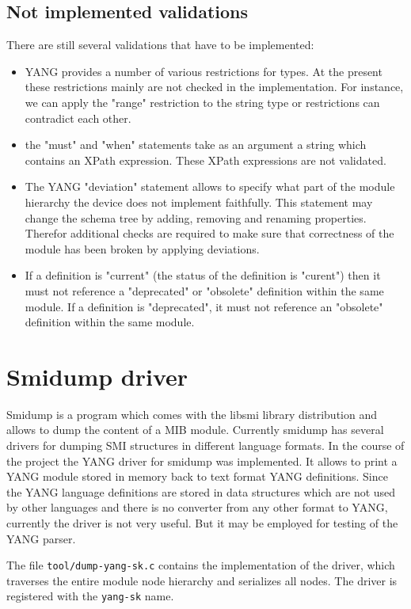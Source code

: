 \documentclass[conference]{IEEEtran}
\begin{document}
\subsection{Not implemented validations}
There are still several validations that have to be implemented:
\begin{itemize}
\item YANG provides a number of various restrictions for types. At the present these restrictions mainly are not checked in the implementation. 
For instance, we can apply the "range" restriction to the string type or restrictions can contradict each other.
\item the "must" and "when" statements take as an argument a string which contains an XPath expression. 
 These XPath expressions are not validated.
\item The YANG "deviation" statement allows to specify what part of the module hierarchy the device does not implement faithfully.
 This statement may change the schema tree by adding, removing and renaming properties. Therefor additional checks are required 
 to make sure that correctness of the module has been broken by applying deviations.
\item If a definition is "current" (the status of the definition is "curent") then it must not reference a "deprecated" or "obsolete" definition within the same module. 
If a definition is "deprecated", it must not reference an "obsolete" definition within the same module.  
\end{itemize}

\section{Smidump driver}
Smidump is a program which comes with the libsmi library distribution and allows to dump the content of a MIB module.
Currently smidump has several drivers for dumping SMI structures in different language formats.
In the course of the project the YANG driver for smidump was implemented. 
It allows to print a YANG module stored in memory back to text format YANG definitions. 
Since the YANG language definitions are stored in data structures which are not used by other languages and there is no converter from any other format to YANG,
currently the driver is not very useful. But it may be employed for testing of the YANG parser.

The file \texttt{tool/dump-yang-sk.c} contains the implementation of the driver, which traverses the entire module node hierarchy and serializes all nodes. The driver is registered with the \texttt{yang-sk} name.
\end{document}
